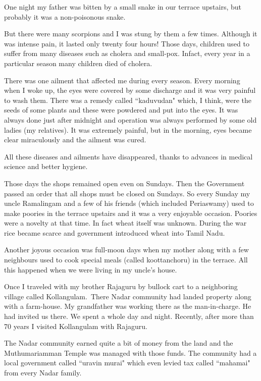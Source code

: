 One night my father was bitten by a small snake in our terr\-ace upstairs, 
but probably it was a non-poisonous snake.

But there were many scorpions and I was stung by them a few times. 
Although it was intense pain, it lasted only twenty four hours! Those 
days, children used to suffer from many disea\-ses such as cholera and 
small-pox. Infact, every year in a parti\-cular season many children died 
of cholera.


There was one ailment that affected me during every season. 
Every morning when I woke up, the eyes were covered by some discharge 
and it was very painful to wash them. There was a remedy called 
``kaduvudan" which, I think, were the seeds of some plants and these were 
powdered and put into the eyes. It was always done just after midnight 
and operation was always performed by some old ladies (my relatives). It 
was extremely painful, but in the morning, eyes became clear 
miraculously and the ailment was cured.


All these diseases and ailments have disappeared, thanks to advances in 
medical science and better hygiene.
 
Those days the shops remained open even on Sundays. Then the Government 
passed an order that all shops must be closed on Sundays. So every 
Sunday my uncle Ramalingam and a few of his friends (which included 
Periaswamy) used to make poories in the terrace upstairs and it was a 
very enjoyable occasion. Poories were a novelty at that time. In fact 
wheat itself was unknown. During the war rice became scarce and 
government introduced wheat into Tamil Nadu.


Another joyous occasion was full-moon days when my mo\-ther along with a 
few neighbours used to cook special meals (ca\-lled koottanchoru) in the 
terrace. All this happened when we were living in my uncle's house.
 
Once I traveled with my brother Rajaguru by bullock cart to a 
neighboring village called Kollangulam.\ There Nadar community had landed 
property along with a farm-house. My grandfather was working there as 
the man-in-charge. He had invited us there. We spent a whole day and 
night. Recently, after more than 70 years I visited Kollangulam with 
Rajaguru.
\newpage

The Nadar community earned quite a bit of money from the land and the 
Muthumariamman Temple was managed with those funds. The community had a 
local government called ``uravin murai" which even levied tax called 
``mahamai" from every Na\-dar family.


